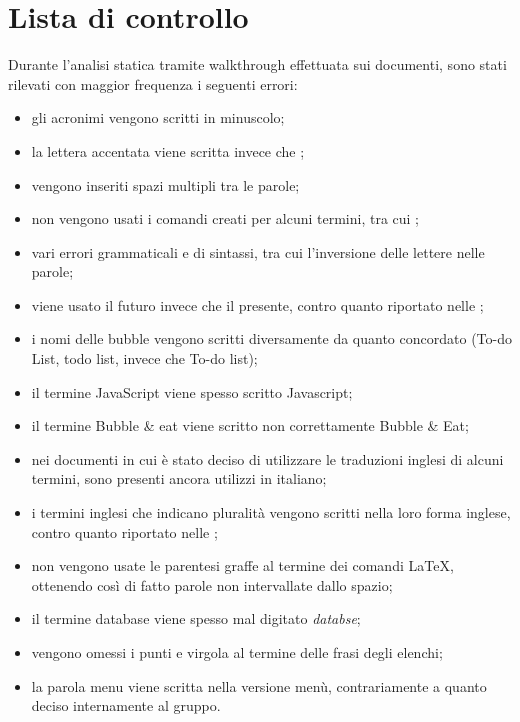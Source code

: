 \section{Lista di controllo}
Durante l'analisi statica tramite walkthrough effettuata sui documenti, sono stati rilevati con maggior frequenza i seguenti errori:
\begin{itemize}
	\item gli acronimi vengono scritti in minuscolo;
	\item la lettera  accentata viene scritta  invece che ;
	\item vengono inseriti spazi multipli tra le parole;
	\item non vengono usati i comandi creati per alcuni termini, tra cui \ProjectName{};
	\item vari errori grammaticali e di sintassi, tra cui l'inversione delle lettere nelle parole;
	\item viene usato il futuro invece che il presente, contro quanto riportato nelle \NormeDiProgetto{};
	\item i nomi delle bubble vengono scritti diversamente da quanto concordato (To-do List, todo list, invece che To-do list);
	\item il termine JavaScript viene spesso scritto Javascript;
	\item il termine Bubble \& eat viene scritto non correttamente Bubble \& Eat;
	\item nei documenti in cui è stato deciso di utilizzare le traduzioni inglesi di alcuni termini, sono presenti ancora utilizzi in italiano;
	\item i termini inglesi che indicano pluralità vengono scritti nella loro forma inglese, contro quanto riportato nelle \NormeDiProgetto{};
	\item non vengono usate le parentesi graffe al termine dei comandi \LaTeX, ottenendo così di fatto parole non intervallate dallo spazio;
	\item il termine database viene spesso mal digitato \textit{databse};
	\item vengono omessi i punti e virgola al termine delle frasi degli elenchi;
	\item la parola menu viene scritta nella versione menù, contrariamente a quanto deciso internamente al gruppo.
\end{itemize}